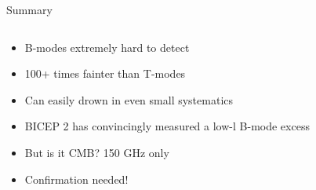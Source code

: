\documentclass{beamer}
\begin{document}
\begin{frame}{Summary}
	\begin{columns}
		\begin{column}{8cm}
			\begin{itemize}
				\item<2-> B-modes extremely hard to detect
				\item<3-> 100+ times fainter than T-modes
				\item<4-> Can easily drown in even small systematics
				\item<5-> BICEP 2 has convincingly measured a low-l B-mode
					excess
				\item<6-> But is it CMB? 150 GHz only
				\item<7-> Confirmation needed!
			\end{itemize}
		\end{column}
		\begin{column}{4cm}
\end{column}
\end{columns}
\end{frame}
\end{document}
